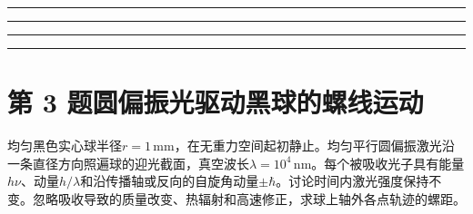 \documentclass[UTF8,fontset=fandol,a4paper,11pt]{ctexart}
\newcommand{\workarea}{\par\vspace{7mm}\noindent{\small\color{muted}作答区}\par\vspace{4mm}
\noindent\textcolor{rulegray}{\rule{\linewidth}{0.3pt}}\par\vspace{16mm}
\noindent\textcolor{rulegray}{\rule{\linewidth}{0.3pt}}\par\vspace{16mm}
\noindent\textcolor{rulegray}{\rule{\linewidth}{0.3pt}}\par\vspace{16mm}
\noindent\textcolor{rulegray}{\rule{\linewidth}{0.3pt}}}
\begin{document}
\workarea

\clearpage


\section*{第 3 题\quad 圆偏振光驱动黑球的螺线运动}\label{q:3}

均匀黑色实心球半径$r=1\,\mathrm{mm}$，在无重力空间起初静止。均匀平行圆偏振激光沿一条直径方向照遍球的迎光截面，真空波长$\lambda=10^4\,\mathrm{nm}$。每个被吸收光子具有能量$h\nu$、动量$h/\lambda$和沿传播轴或反向的自旋角动量$\pm\hbar$。讨论时间内激光强度保持不变。忽略吸收导致的质量改变、热辐射和高速修正，求球上轴外各点轨迹的螺距。

\begin{center}\begin{minipage}{.98\linewidth}\centering
{}
\end{minipage}
\end{center}
\end{document}
